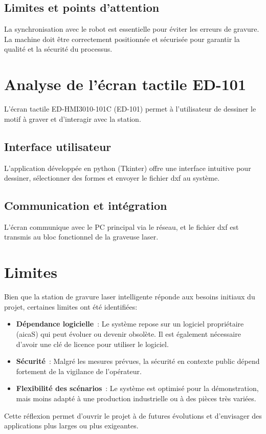 \subsection{Limites et points d’attention}
La synchronisation avec le robot est essentielle pour éviter les erreurs de gravure. La machine doit être correctement positionnée et sécurisée pour garantir la qualité et la sécurité du processus.

\section{Analyse de l’écran tactile ED-101}
L’écran tactile ED-HMI3010-101C (ED-101) permet à l’utilisateur de dessiner le motif à graver et d’interagir avec la station.
\subsection{Interface utilisateur}
L’application développée en \gls{python} (Tkinter) offre une interface intuitive pour dessiner, sélectionner des formes et envoyer le fichier \gls{dxf} au système.
\subsection{Communication et intégration}
L’écran communique avec le PC principal via le réseau, et le fichier \gls{dxf} est transmis au bloc fonctionnel de la graveuse laser.


\section{Limites}
Bien que la station de gravure laser intelligente réponde aux besoins initiaux du projet, certaines limites ont été identifiées:
\begin{itemize}
    \item \textbf{Dépendance logicielle} : Le système repose sur un logiciel propriétaire (\gls{aicaS}) qui peut évoluer ou devenir obsolète. Il est également nécessaire d'avoir une clé de licence pour utiliser le logiciel.
    \item \textbf{Sécurité} : Malgré les mesures prévues, la sécurité en contexte public dépend fortement de la vigilance de l'opérateur.
    \item \textbf{Flexibilité des scénarios} : Le système est optimisé pour la démonstration, mais moins adapté à une production industrielle ou à des pièces très variées.
\end{itemize}

Cette réflexion permet d'ouvrir le projet à de futures évolutions et d'envisager des applications plus larges ou plus exigeantes.



